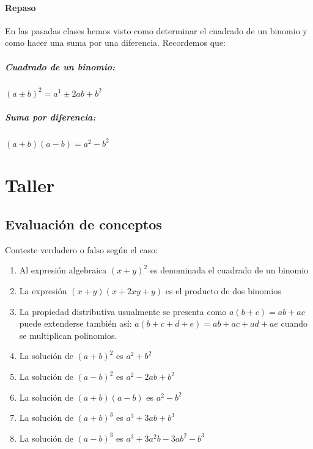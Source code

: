 \documentclass[10pt,twoside]{article}
\begin{document}
\paragraph*{Repaso}
En las pasadas clases hemos visto como determinar el cuadrado de un binomio y como hacer una suma por una diferencia. Recordemos que:
\subparagraph*{Cuadrado de un binomio:} $(a\pm b)^{2}=a^{1}\pm 2ab+b^{2}$
\subparagraph*{Suma por diferencia:} $(a+b)(a-b)=a^{2}-b^{2}$
\section*{Taller}
\subsection*{Evaluaci\'{o}n de conceptos}
Conteste verdadero o falso seg\'{u}n el caso:
\begin{enumerate}
\item Al expresi\'{o}n algebraica $(x+y)^{2}$ es denominada el cuadrado de un binomio
\item La expresi\'{o}n $(x+y)(x+2xy+y)$ es el producto de dos binomios
\item La propiedad distributiva usualmente se presenta como $a(b+c)=ab+ac$ puede extenderse también así: $a(b+c+d+e)=ab+ac+ad+ae$ cuando se multiplican polinomios.
\item La solución de $(a+b)^2$ es $a^2+b^2$
\item La solución de $(a-b)^2$ es $a^2-2ab+b^2$
\item La soluci\'{o}n de $(a+b)(a-b)$ es $a^{2}-b^{2}$
\item La soluci\'{o}n de $(a+b)^{3}$ es $a^{3}+3ab+b^{3}$
\item La soluci\'{o}n de $(a-b)^{3}$ es $a^{3}+3a^{2}b-3ab^{2}-b^{3}$
\end{enumerate}
\end{document}
